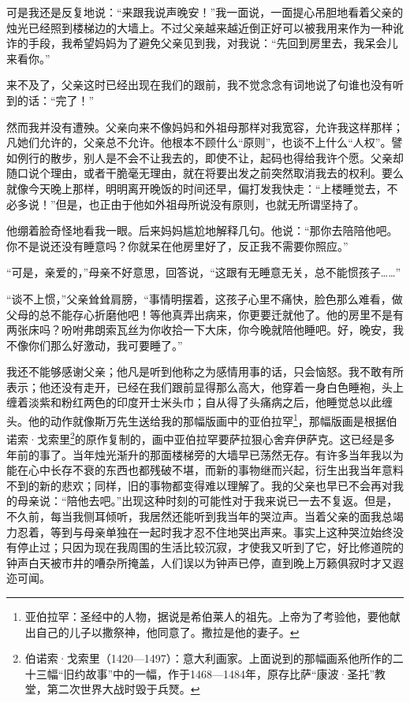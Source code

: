\par 可是我还是反复地说：“来跟我说声晚安！”我一面说，一面提心吊胆地看着父亲的烛光已经照到楼梯边的大墙上。不过父亲越来越近倒正好可以被我用来作为一种讹诈的手段，我希望妈妈为了避免父亲见到我，对我说：“先回到房里去，我呆会儿来看你。”
\par 来不及了，父亲这时已经出现在我们的跟前，我不觉念念有词地说了句谁也没有听到的话：“完了！”
\par 然而我并没有遭殃。父亲向来不像妈妈和外祖母那样对我宽容，允许我这样那样；凡她们允许的，父亲总不允许。他根本不顾什么“原则”，也谈不上什么“人权”。譬如例行的散步，别人是不会不让我去的，即使不让，起码也得给我许个愿。父亲却随口说个理由，或者干脆毫无理由，就在将要出发之前突然取消我去的权利。要么就像今天晚上那样，明明离开晚饭的时间还早，偏打发我快走：“上楼睡觉去，不必多说！”但是，也正由于他如外祖母所说没有原则，也就无所谓坚持了。
\par 他绷着脸奇怪地看我一眼。后来妈妈尴尬地解释几句。他说：“那你去陪陪他吧。你不是说还没有睡意吗？你就呆在他房里好了，反正我不需要你照应。”
\par “可是，亲爱的，”母亲不好意思，回答说，“这跟有无睡意无关，总不能惯孩子……”
\par “谈不上惯，”父亲耸耸肩膀，“事情明摆着，这孩子心里不痛快，脸色那么难看，做父母的总不能存心折磨他吧！等他真弄出病来，你更要迁就他了。他的房里不是有两张床吗？吩咐弗朗索瓦丝为你收拾一下大床，你今晚就陪他睡吧。好，晚安，我不像你们那么好激动，我可要睡了。”
\par 我还不能够感谢父亲；他凡是听到他称之为感情用事的话，只会恼怒。我不敢有所表示；他还没有走开，已经在我们跟前显得那么高大，他穿着一身白色睡袍，头上缠着淡紫和粉红两色的印度开士米头巾；自从得了头痛病之后，他睡觉总以此缠头。他的动作就像斯万先生送给我的那幅版画中的亚伯拉罕\footnote{亚伯拉罕：圣经中的人物，据说是希伯莱人的祖先。上帝为了考验他，要他献出自己的儿子以撒祭神，他同意了。撒拉是他的妻子。}，那幅版画是根据伯诺索·戈索里\footnote{伯诺索·戈索里（1420—1497）：意大利画家。上面说到的那幅画系他所作的二十三幅“旧约故事”中的一幅，作于1468—1484年，原存比萨“康波·圣托”教堂，第二次世界大战时毁于兵燹。}的原作复制的，画中亚伯拉罕要萨拉狠心舍弃伊萨克。这已经是多年前的事了。当年烛光渐升的那面楼梯旁的大墙早已荡然无存。有许多当年我以为能在心中长存不衰的东西也都残破不堪，而新的事物继而兴起，衍生出我当年意料不到的新的悲欢；同样，旧的事物都变得难以理解了。我的父亲也早已不会再对我的母亲说：“陪他去吧。”出现这种时刻的可能性对于我来说已一去不复返。但是，不久前，每当我侧耳倾听，我居然还能听到我当年的哭泣声。当着父亲的面我总竭力忍着，等到与母亲单独在一起时我才忍不住地哭出声来。事实上这种哭泣始终没有停止过；只因为现在我周围的生活比较沉寂，才使我又听到了它，好比修道院的钟声白天被市井的嘈杂所掩盖，人们误以为钟声已停，直到晚上万籁俱寂时才又遐迩可闻。
